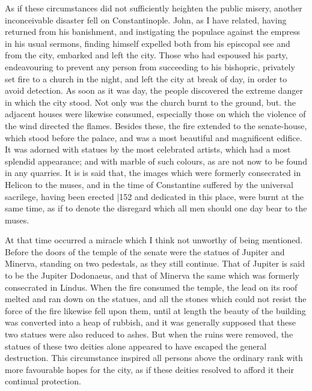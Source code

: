As if these circumstances did not sufficiently heighten the public misery, another inconceivable disaster fell on Constantinople. John, as I have related, having returned from his banishment, and instigating the populace against the empress in his usual sermons, finding himself expelled both from his episcopal see and from the city, embarked and left the city. Those who had espoused his party, endeavouring to prevent any person from succeeding to his bishopric, privately set fire to a church in the night, and left the city at break of day, in order to avoid detection. As soon as it was day, the people discovered the extreme danger in which the city stood. Not only was the church burnt to the ground, but. the adjacent houses were likewise consumed, especially those on which the violence of the wind directed the flames. Besides these, the fire extended to the senate-house, which stood before the palace, and was a most beautiful and magnificent edifice. It was adorned with statues by the most celebrated artists, which had a most splendid appearance; and with marble of such colours, as are not now to be found in any quarries. It is is said that, the images which were formerly consecrated in Helicon to the muses, and in the time of Constantine suffered by the universal sacrilege, having been erected
|152 and dedicated in this place, were burnt at the same time, as if to denote the disregard which all men should one day bear to the muses.

At that time occurred a miracle which I think not unworthy of being mentioned. Before the doors of the temple of the senate were the statues of Jupiter and Minerva, standing on two pedestals, as they still continue. That of Jupiter is said to be the Jupiter Dodonaeus, and that of Minerva the same which was formerly consecrated in Lindus. When the fire consumed the temple, the lead on its roof melted and ran down on the statues, and all the stones which could not resist the force of the fire likewise fell upon them, until at length the beauty of the building was converted into a heap of rubbish, and it was generally supposed that these two statues were also reduced to ashes. But when the ruins were removed, the statues of these two deities alone appeared to have escaped the general destruction. This circumstance inspired all persons above the ordinary rank with more favourable hopes for the city, as if these deities resolved to afford it their continual protection.

